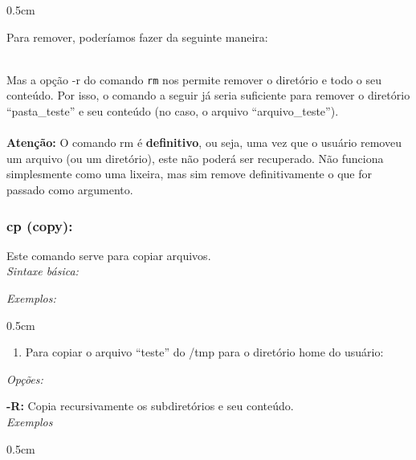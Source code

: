 \begin{refsection}
\begin {myindentpar}{0.5cm}
\begin{enumerate}[\itshape i.]
Para remover, poderíamos fazer da seguinte maneira:\\
 \\

Mas a opção -r do comando \texttt{rm} nos permite remover o diretório e todo o seu conteúdo. Por isso, o comando a seguir já seria suficiente para remover o diretório ``pasta\_teste'' e seu conteúdo (no caso, o arquivo ``arquivo\_teste'').\\
\\
\textbf{Atenção:} O comando rm é \textbf{definitivo}, ou seja, uma vez que o usuário removeu um arquivo (ou um diretório), este não poderá ser recuperado. Não funciona simplesmente como uma lixeira, mas sim remove definitivamente o que for passado como argumento.\\

\end{enumerate}
\end{myindentpar}

\subsubsection{cp (copy):}\label{tut1:text_mode:commands:cp}

 Este comando serve para copiar arquivos.\\

\textit{Sintaxe básica:}
\\

\textit{Exemplos:}
\begin {myindentpar}{0.5cm}
\begin{enumerate}[\itshape i.]

\item{Para copiar o arquivo ``teste'' do /tmp para o diretório home do usuário:}\\
\end{enumerate}
\end{myindentpar}

\textit{Opções:}

 \textbf{-R:} Copia recursivamente os subdiretórios e seu conteúdo.\\

\textit{Exemplos}
\begin {myindentpar}{0.5cm}
\begin{enumerate}[\itshape i.]


\end{enumerate}
\end{myindentpar}
\end{refsection}
